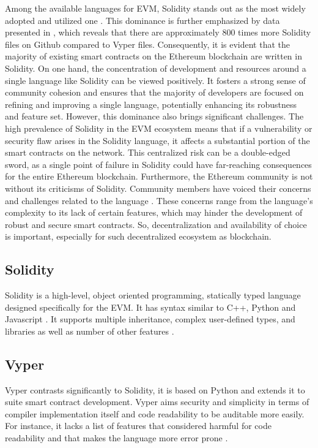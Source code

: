Among the available languages for EVM, Solidity stands out as the most widely adopted and utilized one \cite{SolidityWidelyUsed, SolidityDevsChallenges}. This dominance is further emphasized by data presented in \cite{SolidityVyperGithubUsage}, which reveals that there are approximately 800 times more Solidity files on Github compared to Vyper files. Consequently, it is evident that the majority of existing smart contracts on the Ethereum blockchain are written in Solidity. On one hand, the concentration of development and resources around a single language like Solidity can be viewed positively. It fosters a strong sense of community cohesion and ensures that the majority of developers are focused on refining and improving a single language, potentially enhancing its robustness and feature set. However, this dominance also brings significant challenges. The high prevalence of Solidity in the EVM ecosystem means that if a vulnerability or security flaw arises in the Solidity language, it affects a substantial portion of the smart contracts on the network. This centralized risk can be a double-edged sword, as a single point of failure in Solidity could have far-reaching consequences for the entire Ethereum blockchain. Furthermore, the Ethereum community is not without its criticisms of Solidity. Community members have voiced their concerns and challenges related to the language \cite{SolidityDevsChallenges}. These concerns range from the language's complexity to its lack of certain features, which may hinder the development of robust and secure smart contracts. So, decentralization and availability of choice is important, especially for such decentralized ecosystem as blockchain.

\subsection{Solidity}

Solidity is a high-level, object oriented programming, statically typed language designed specifically for the EVM. It has syntax similar to C++, Python and Javascript \cite{SolidityInspirasion}. It supports multiple inheritance, complex user-defined types, and libraries as well as number of other features \cite{SolidityFeatures}.

\subsection{Vyper}

Vyper contrasts significantly to Solidity, it is based on Python and extends it to suite smart contract development. Vyper aims security and simplicity in terms of compiler implementation itself and code readability to be auditable more easily. For instance, it lacks a list of features that considered harmful for code readability and that makes the language more error prone \cite{VyperDescription}.

